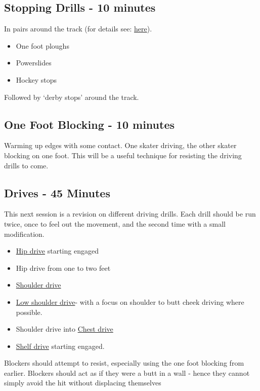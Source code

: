 \documentclass{journal}
\begin{document}
\subsection*{Stopping Drills - 10 minutes}
In pairs around the track (for details see: \hyperref[drill:stopping/dynamic_take]{here}).
\begin{itemize}
    \item One foot ploughs 
    \item Powerslides
    \item Hockey stops
\end{itemize}


Followed by `derby stops' around the track.

\subsection*{One Foot Blocking - 10 minutes}

Warming up edges with some contact. 
One skater driving, the other skater blocking on one foot. 
This will be a useful technique for resisting the driving drills to come.


\subsection*{Drives - 45 Minutes}
This next session is a revision on different driving drills.
Each drill should be run twice, once to feel out the movement, and the second time with a small modification.

\begin{itemize}
\item \hyperref[drill:drives/hip]{Hip drive} starting engaged
\item Hip drive from one to two feet 
\item \hyperref[drill:drives/shoulder]{Shoulder drive} 
\item \hyperref[drill:drives/low_shoulder]{Low shoulder drive}- with a focus on shoulder to butt cheek driving where possible. 
\item Shoulder drive into \hyperref[drill:drives/chest]{Chest drive}
\item \hyperref[drill:drives/shelf]{Shelf drive} starting engaged.
\end{itemize}

Blockers should attempt to resist, especially using the one foot blocking from earlier.
Blockers should act as if they were a butt in a wall - hence they cannot simply avoid the hit without displacing themselves 
\end{document}
